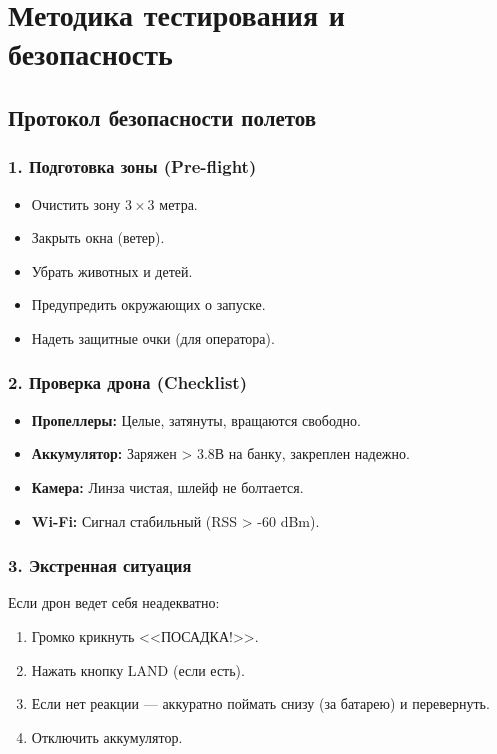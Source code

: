 \appendix
\section{Методика тестирования и безопасность}

\subsection{Протокол безопасности полетов}

\subsubsection{1. Подготовка зоны (Pre-flight)}
\begin{itemize}
    \item Очистить зону $3 \times 3$ метра.
    \item Закрыть окна (ветер).
    \item Убрать животных и детей.
    \item Предупредить окружающих о запуске.
    \item Надеть защитные очки (для оператора).
\end{itemize}

\subsubsection{2. Проверка дрона (Checklist)}
\begin{itemize}
    \item \textbf{Пропеллеры:} Целые, затянуты, вращаются свободно.
    \item \textbf{Аккумулятор:} Заряжен > 3.8В на банку, закреплен надежно.
    \item \textbf{Камера:} Линза чистая, шлейф не болтается.
    \item \textbf{Wi-Fi:} Сигнал стабильный (RSS > -60 dBm).
\end{itemize}

\subsubsection{3. Экстренная ситуация}
Если дрон ведет себя неадекватно:
\begin{enumerate}
    \item Громко крикнуть <<ПОСАДКА!>>.
    \item Нажать кнопку LAND (если есть).
    \item Если нет реакции — аккуратно поймать снизу (за батарею) и перевернуть.
    \item Отключить аккумулятор.
\end{enumerate}

